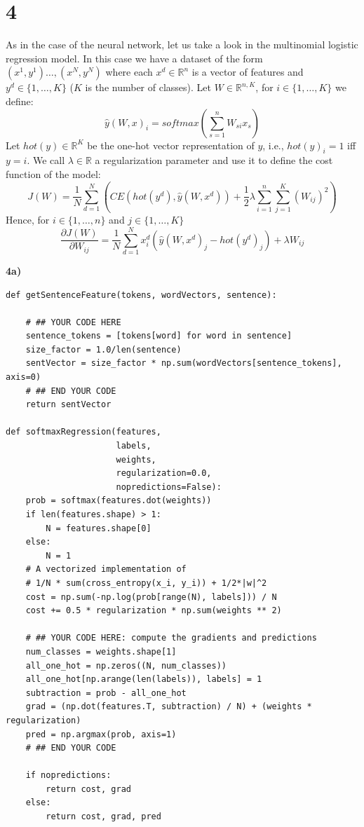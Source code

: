 \documentclass{article}
\begin{document}
\section{4}

As in the case of the neural network, let us take a look in the multinomial logistic regression model. In this case we have a dataset of the form $(x^{1},y^{1}) \dots ,(x^{N},y^{N})$ where each $x^{d} \in \mathbb{R}^{n}$ is a vector of features and $y^{d} \in\{1, \dots, K\}$ ($K$ is the number of classes). Let $W \in \mathbb{R}^{n,K}$, for $i \in\{1, \dots, K\}$  we define:
\[
\hat{y}(W,x)_{i} = softmax(\sum_{s=1}^{n}W_{si}x_{s})
\]
Let $hot(y) \in \mathbb{R}^{K}$ be the one-hot vector representation of $y$, i.e., $hot(y)_{i} = 1$ iff $y=i$. We call $\lambda \in \mathbb{R}$ a regularization parameter and use it to define the cost function of the model:
\[
J(W) = \frac{1}{N}\sum_{d=1}^{N}(CE(hot(y^{d}),\hat{y}(W,x^{d}))  + \frac{1}{2}\lambda\sum_{i=1}^{n}\sum_{j=1}^{K} (W_{ij})^{2})
\]
Hence, for $i \in\{1, \dots, n\}$ and $j \in\{1, \dots, K\}$
\[
\frac{\partial J(W)}{\partial W_{ij}} = \frac{1}{N}\sum_{d=1}^{N}x^{d}_{i}(\hat{y}(W,x^{d})_{j} - hot(y^{d})_{j})  + \lambda W_{ij}
\]



\textbf{4a)}
\begin{verbatim}
def getSentenceFeature(tokens, wordVectors, sentence):

    # ## YOUR CODE HERE
    sentence_tokens = [tokens[word] for word in sentence]
    size_factor = 1.0/len(sentence)
    sentVector = size_factor * np.sum(wordVectors[sentence_tokens], axis=0)
    # ## END YOUR CODE
    return sentVector

def softmaxRegression(features,
                      labels,
                      weights,
                      regularization=0.0,
                      nopredictions=False):
    prob = softmax(features.dot(weights))
    if len(features.shape) > 1:
        N = features.shape[0]
    else:
        N = 1
    # A vectorized implementation of
    # 1/N * sum(cross_entropy(x_i, y_i)) + 1/2*|w|^2
    cost = np.sum(-np.log(prob[range(N), labels])) / N
    cost += 0.5 * regularization * np.sum(weights ** 2)

    # ## YOUR CODE HERE: compute the gradients and predictions
    num_classes = weights.shape[1]
    all_one_hot = np.zeros((N, num_classes))
    all_one_hot[np.arange(len(labels)), labels] = 1
    subtraction = prob - all_one_hot
    grad = (np.dot(features.T, subtraction) / N) + (weights * regularization)
    pred = np.argmax(prob, axis=1)
    # ## END YOUR CODE

    if nopredictions:
        return cost, grad
    else:
        return cost, grad, pred
\end{verbatim}
\end{document}
